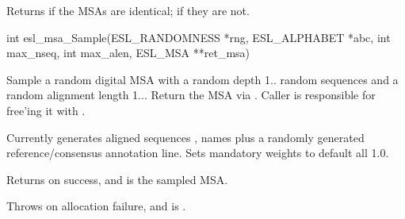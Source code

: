 \begin{sreapi}
Returns  if the MSAs are identical; 
 if they are not.


\hypertarget{func:esl_msa_Sample()}
{\item[int esl\_msa\_Sample(ESL\_RANDOMNESS *rng, ESL\_ALPHABET *abc, int max\_nseq, int max\_alen, ESL\_MSA **ret\_msa)]}

Sample a random digital MSA with a random depth 1..
random sequences and a random alignment length
1... Return the MSA via . Caller is 
responsible for free'ing it with .

Currently generates aligned sequences , names
 plus a randomly generated reference/consensus
annotation line. Sets mandatory weights to default all
1.0. 

Returns  on success, and  is the sampled MSA.

Throws  on allocation failure, and  is .



\end{sreapi}


